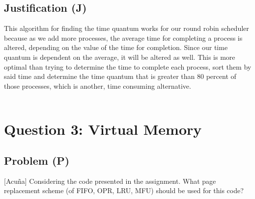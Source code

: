 \documentclass[12pt]{article}
\begin{document}
        \subsection{Justification (J)}
        This algorithm for finding the time quantum works for our round robin scheduler because as we add more processes, the average 
        time for completing a process is altered, depending on the value of the time for completion. Since our time quantum is dependent 
        on the average, it will be altered as well. This is more optimal than trying to determine the time to complete each process, 
        sort them by said time and determine the time quantum that is greater than 80 percent of those processes, which is another, 
        time consuming alternative. \\
        \\
    \section{Question 3: Virtual Memory}
        \subsection{Problem (P)}
        [Acuña] Considering the code presented in the assignment. What page replacement scheme (of FIFO, OPR, LRU, MFU) 
        should be used for this code? \\
        \\
\end{document}
